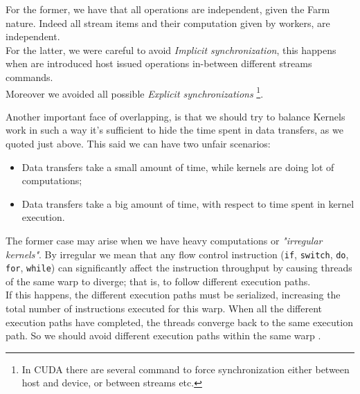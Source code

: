 	For the former, we have that all operations are independent, given the Farm nature. Indeed all stream items and their computation given by workers, are independent.\\
	For the latter, we were careful to avoid \textit{Implicit synchronization}, this happens when are introduced host issued operations in-between different streams commands.\\
	Moreover we avoided all possible \textit{Explicit synchronizations} \footnote{In CUDA there are several command to force synchronization either between host and device, or between streams etc.}.
	
	Another important face of overlapping, is that we should try to balance Kernels work in such a way it's sufficient to hide the time spent in data transfers, as we quoted just above. 
	This said we can have two unfair scenarios:
	\begin{itemize}
		\item Data transfers take a small amount of time, while kernels are doing lot of computations;
		
		\item Data transfers take a big amount of time, with respect to time spent in kernel execution.
	\end{itemize}
	
	The former case may arise when we have heavy computations or \textit{"irregular kernels"}.
	By irregular we mean that any flow control instruction (\texttt{if}, \texttt{switch}, \texttt{do}, \texttt{for}, \texttt{while}) can significantly affect the instruction throughput by causing threads of the same warp to diverge; that is, to follow different execution paths.\\ 
	If this happens, the different execution paths must be serialized, increasing the total number of instructions executed for this warp. When all the different execution paths have completed, the threads converge back to the same execution path.	
	So we should avoid different execution paths within the same warp \cite{cudaguide}.\\
	
